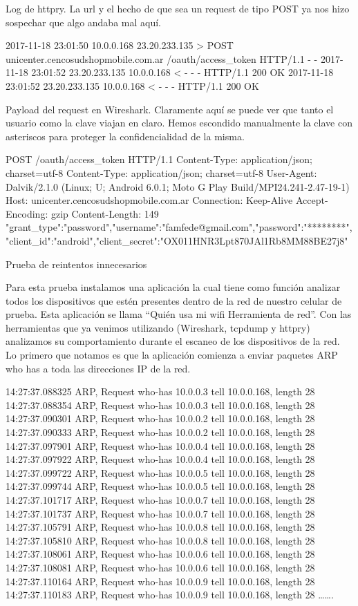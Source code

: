 Log de httpry. La url y el hecho de que sea un request de tipo POST ya nos hizo sospechar que algo andaba mal aquí.

2017-11-18 23:01:50	10.0.0.168	23.20.233.135	>	POST	unicenter.cencosudshopmobile.com.ar	/oauth/access_token	HTTP/1.1	-	-
2017-11-18 23:01:52	23.20.233.135	10.0.0.168	<	-	-	-	HTTP/1.1	200	OK
2017-11-18 23:01:52	23.20.233.135	10.0.0.168	<	-	-	-	HTTP/1.1	200	OK

Payload del request en Wireshark. Claramente aquí se puede ver que tanto el usuario como la clave viajan en claro. Hemos escondido manualmente la clave con asteriscos para proteger la confidencialidad de la misma.

POST /oauth/access_token HTTP/1.1
Content-Type: application/json; charset=utf-8
Content-Type: application/json; charset=utf-8
User-Agent: Dalvik/2.1.0 (Linux; U; Android 6.0.1; Moto G Play Build/MPI24.241-2.47-19-1)
Host: unicenter.cencosudshopmobile.com.ar
Connection: Keep-Alive
Accept-Encoding: gzip
Content-Length: 149
{"grant_type":"password","username":"famfede@gmail.com","password":"********","client_id":"android","client_secret":"OX011HNR3Lpt870JAl1Rb8MM88BE27j8"}


Prueba de reintentos innecesarios

Para esta prueba instalamos una aplicación la cual tiene como función analizar todos los dispositivos que estén presentes dentro de la red de nuestro celular de prueba. Esta aplicación se llama “Quién usa mi wifi Herramienta de red”. Con las herramientas que ya venimos utilizando (Wireshark, tcpdump y httpry) analizamos su comportamiento durante el escaneo de los dispositivos de la red. Lo primero que notamos es que la aplicación comienza a enviar paquetes ARP who has a toda las direcciones IP de la red. 

14:27:37.088325 ARP, Request who-has 10.0.0.3 tell 10.0.0.168, length 28
14:27:37.088354 ARP, Request who-has 10.0.0.3 tell 10.0.0.168, length 28
14:27:37.090301 ARP, Request who-has 10.0.0.2 tell 10.0.0.168, length 28
14:27:37.090333 ARP, Request who-has 10.0.0.2 tell 10.0.0.168, length 28
14:27:37.097901 ARP, Request who-has 10.0.0.4 tell 10.0.0.168, length 28
14:27:37.097922 ARP, Request who-has 10.0.0.4 tell 10.0.0.168, length 28
14:27:37.099722 ARP, Request who-has 10.0.0.5 tell 10.0.0.168, length 28
14:27:37.099744 ARP, Request who-has 10.0.0.5 tell 10.0.0.168, length 28
14:27:37.101717 ARP, Request who-has 10.0.0.7 tell 10.0.0.168, length 28
14:27:37.101737 ARP, Request who-has 10.0.0.7 tell 10.0.0.168, length 28
14:27:37.105791 ARP, Request who-has 10.0.0.8 tell 10.0.0.168, length 28
14:27:37.105810 ARP, Request who-has 10.0.0.8 tell 10.0.0.168, length 28
14:27:37.108061 ARP, Request who-has 10.0.0.6 tell 10.0.0.168, length 28
14:27:37.108081 ARP, Request who-has 10.0.0.6 tell 10.0.0.168, length 28
14:27:37.110164 ARP, Request who-has 10.0.0.9 tell 10.0.0.168, length 28
14:27:37.110183 ARP, Request who-has 10.0.0.9 tell 10.0.0.168, length 28
…….

